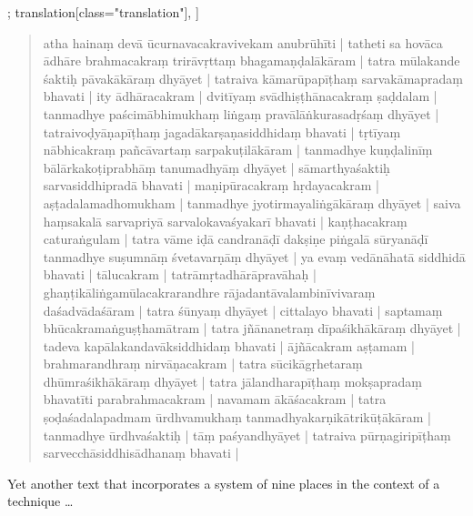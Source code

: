 \begin{alignment}[
  texts=edition[class="edition"];
  translation[class="translation"],
  ]
\begin{translation}
\begin{tlate}
{\begin{quote}
          atha hainaṃ devā ūcurnavacakravivekam anubrūhīti | tatheti sa hovāca ādhāre brahmacakraṃ trirāvṛttaṃ bhagamaṇḍalākāram | tatra mūlakande śaktiḥ pāvakākāraṃ dhyāyet | tatraiva kāmarūpapīṭhaṃ sarvakāmapradaṃ bhavati | ity ādhāracakram | dvitīyaṃ svādhiṣṭhānacakraṃ ṣaḍdalam | tanmadhye paścimābhimukhaṃ liṅgaṃ pravālāṅkurasadṛśaṃ dhyāyet | tatraivoḍyāṇapīṭhaṃ jagadākarṣaṇasiddhidaṃ bhavati | tṛtīyaṃ nābhicakraṃ pañcāvartaṃ sarpakuṭilākāram | tanmadhye kuṇḍalinīṃ bālārkakoṭiprabhāṃ tanumadhyāṃ dhyāyet | sāmarthyaśaktiḥ sarvasiddhipradā bhavati | maṇipūracakraṃ hṛdayacakram | aṣṭadalamadhomukham | tanmadhye jyotirmayaliṅgākāraṃ dhyāyet | saiva haṃsakalā sarvapriyā sarvalokavaśyakarī bhavati | kaṇṭhacakraṃ caturaṅgulam | tatra vāme iḍā candranāḍī dakṣiṇe piṅgalā sūryanāḍī tanmadhye suṣumnāṃ śvetavarṇāṃ dhyāyet | ya evaṃ vedānāhatā siddhidā bhavati | tālucakram | tatrāmṛtadhārāpravāhaḥ | ghaṇṭikāliṅgamūlacakrarandhre rājadantāvalambinīvivaraṃ daśadvādaśāram | tatra śūnyaṃ dhyāyet | cittalayo bhavati | saptamaṃ bhūcakramaṅguṣṭhamātram | tatra jñānanetraṃ dīpaśikhākāraṃ dhyāyet | tadeva kapālakandavāksiddhidaṃ bhavati | ājñācakram aṣṭamam | brahmarandhraṃ nirvāṇacakram | tatra sūcikāgṛhetaraṃ dhūmraśikhākāraṃ dhyāyet | tatra jālandharapīṭhaṃ mokṣapradaṃ bhavatīti parabrahmacakram | navamam ākāśacakram | tatra ṣoḍaśadalapadmam ūrdhvamukhaṃ tanmadhyakarṇikātrikūṭākāram | tanmadhye ūrdhvaśaktiḥ | tāṃ paśyandhyāyet | tatraiva pūrṇagiripīṭhaṃ sarvecchāsiddhisādhanaṃ bhavati |
        \end{quote}
      Yet another text that incorporates a system of nine places in the context of a technique \ldots}
    \end{tlate}
  \end{translation}
       \ekdpb*{}
\end{alignment}
